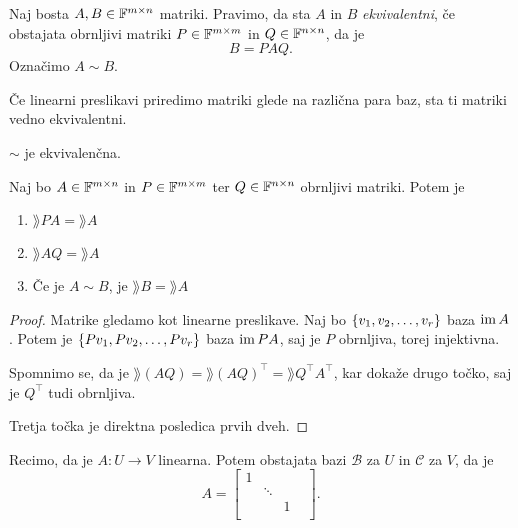 \documentclass[12pt, a4paper]{article}
\begin{document}
\begin{definicija}
Naj bosta $A,B\in\mathbb{F}^{m\times n}$ matriki. Pravimo, da sta $A$ in $B$ \emph{ekvivalentni}, če obstajata obrnljivi matriki $P\in\mathbb{F}^{m\times m}$ in $Q\in\mathbb{F}^{n\times n}$, da je
\[
B=PAQ.
\]
Označimo $A\sim B$.
\end{definicija}

\begin{opomba}
Če linearni preslikavi priredimo matriki glede na različna para baz, sta ti matriki vedno ekvivalentni.
\end{opomba}

\begin{posledica}
$\sim$ je ekvivalenčna.
\end{posledica}

\obvs

\begin{lema}
Naj bo $A\in\mathbb{F}^{m\times n}$ in $P\in\mathbb{F}^{m\times m}$ ter $Q\in\mathbb{F}^{n\times n}$ obrnljivi matriki. Potem je

\begin{enumerate}[label=\roman*)]
\item $\rang PA=\rang A$
\item $\rang AQ=\rang A$
\item Če je $A\sim B$, je $\rang B=\rang A$
\end{enumerate}
\end{lema}

\begin{proof}
Matrike gledamo kot linearne preslikave. Naj bo $\left\{v_1,v_2,\dots,v_r\right\}$ baza $\operatorname{im} A$. Potem je $\left\{Pv_1,Pv_2,\dots,Pv_r\right\}$ baza $\operatorname{im} PA$, saj je $P$ obrnljiva, torej injektivna.

Spomnimo se, da je $\rang(AQ)=\rang(AQ)^\top=\rang Q^\top A^\top$, kar dokaže drugo točko, saj je $Q^\top$ tudi obrnljiva.

Tretja točka je direktna posledica prvih dveh.
\end{proof}

\begin{lema}
Recimo, da je $A\colon U\to V$ linearna. Potem obstajata bazi $\mathcal{B}$ za $U$ in $\mathcal{C}$ za $V$, da je
\[
A=\begin{bmatrix}
1 &        &   &   \\ 
  & \ddots &   &   \\ 
  &        & 1 &   \\ 
  &        &   &  
\end{bmatrix}.
\]
\end{lema}
\end{document}
